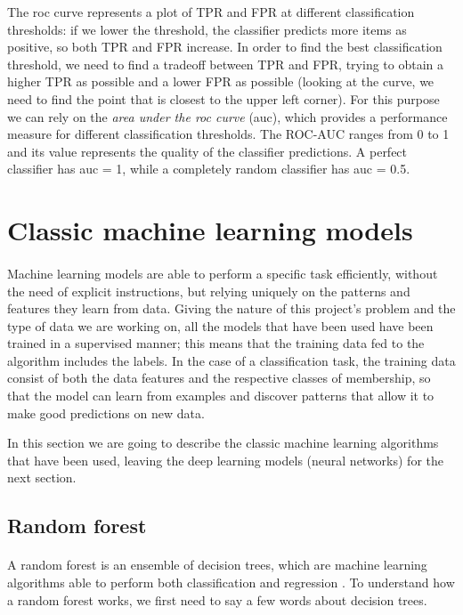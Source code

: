 The \acs{roc} curve represents a plot of TPR and FPR at different classification thresholds: if we lower the threshold, the classifier predicts more items as positive, so both TPR and FPR increase. In order to find the best classification threshold, we need to find a tradeoff between TPR and FPR, trying to obtain a higher TPR as possible and a lower FPR as possible (looking at the curve, we need to find the point that is closest to the upper left corner). For this purpose we can rely on the \textit{area under the \acs{roc} curve} (\acs{auc}), which provides a performance measure for different classification thresholds. The ROC-AUC ranges from 0 to 1 and its value represents the quality of the classifier predictions. A perfect classifier has \acs{auc} = 1, while a completely random classifier has \acs{auc} = 0.5.


\section{Classic machine learning models} \label{sec: classic_ml_models}
\paragraph{} Machine learning models are able to perform a specific task efficiently, without the need of explicit instructions, but relying uniquely on the patterns and features they learn from data. Giving the nature of this project's problem and the type of data we are working on, all the models that have been used have been trained in a supervised manner; this means that the training data fed to the algorithm includes the labels. In the case of a classification task, the training data consist of both the data features and the respective classes of membership, so that the model can learn from examples and discover patterns that allow it to make good predictions on new data.

In this section we are going to describe the classic machine learning algorithms that have been used, leaving the deep learning models (neural networks) for the next section.

\subsection{Random forest}
\paragraph{} A random forest is an ensemble of decision trees, which are machine learning algorithms able to perform both classification and regression \cite{OReilly:handsonML}. To understand how a random forest works, we first need to say a few words about decision trees.

